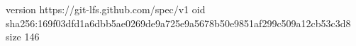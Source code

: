 version https://git-lfs.github.com/spec/v1
oid sha256:169f03dfd1a6dbb5ae0269de9a725e9a5678b50e9851af299c509a12cb53c3d8
size 146
